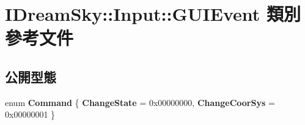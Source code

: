 \hypertarget{class_i_dream_sky_1_1_input_1_1_g_u_i_event}{}\section{I\+Dream\+Sky\+:\+:Input\+:\+:G\+U\+I\+Event 類別 參考文件}
\label{class_i_dream_sky_1_1_input_1_1_g_u_i_event}
\subsection*{公開型態}
\begin{DoxyCompactItemize}
\item 
enum {\bfseries Command} \{ {\bfseries Change\+State} = 0x00000000, 
{\bfseries Change\+Coor\+Sys} = 0x00000001
 \}\hypertarget{class_i_dream_sky_1_1_input_1_1_g_u_i_event_a69a298463b7e6b61ce226082fc522a1e}{}\label{class_i_dream_sky_1_1_input_1_1_g_u_i_event_a69a298463b7e6b61ce226082fc522a1e}

\end{DoxyCompactItemize}
